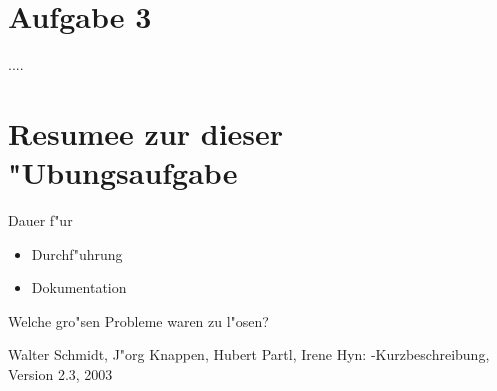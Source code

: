 \documentclass[a4paper,11pt,titlepage]{article}
\begin{document}
\section{Aufgabe 3}
....

\section{Resumee zur dieser "Ubungsaufgabe}
Dauer f"ur 
\begin{itemize}
	\item Durchf"uhrung
	\item Dokumentation
\end{itemize}
Welche gro"sen Probleme waren zu l"osen?

\begin{thebibliography}{99}
	Walter Schmidt, J"org Knappen, Hubert Partl, Irene Hyn: 
\LaTeXe-Kurzbeschreibung, 	Version 2.3, 2003
	

\end{thebibliography}
\end{document}
